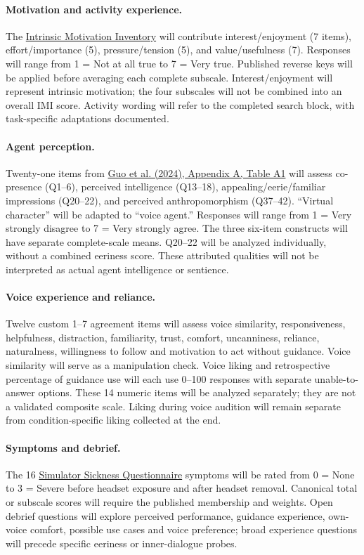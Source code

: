 \documentclass[11pt,letterpaper]{article}
\begin{document}
\paragraph{Motivation and activity experience.} The \href{https://selfdeterminationtheory.org/intrinsic-motivation-inventory/}{Intrinsic Motivation Inventory} will contribute interest/enjoyment (7 items), effort/importance (5), pressure/tension (5), and value/usefulness (7). Responses will range from 1 = Not at all true to 7 = Very true. Published reverse keys will be applied before averaging each complete subscale. Interest/enjoyment will represent intrinsic motivation; the four subscales will not be combined into an overall IMI score. Activity wording will refer to the completed search block, with task-specific adaptations documented.

\paragraph{Agent perception.} Twenty-one items from \href{https://doi.org/10.1145/3651288}{Guo et al. (2024), Appendix A, Table A1} will assess co-presence (Q1--6), perceived intelligence (Q13--18), appealing/eerie/familiar impressions (Q20--22), and perceived anthropomorphism (Q37--42). ``Virtual character'' will be adapted to ``voice agent.'' Responses will range from 1 = Very strongly disagree to 7 = Very strongly agree. The three six-item constructs will have separate complete-scale means. Q20--22 will be analyzed individually, without a combined eeriness score. These attributed qualities will not be interpreted as actual agent intelligence or sentience.

\paragraph{Voice experience and reliance.} Twelve custom 1--7 agreement items will assess voice similarity, responsiveness, helpfulness, distraction, familiarity, trust, comfort, uncanniness, reliance, naturalness, willingness to follow and motivation to act without guidance. Voice similarity will serve as a manipulation check. Voice liking and retrospective percentage of guidance use will each use 0--100 responses with separate unable-to-answer options. These 14 numeric items will be analyzed separately; they are not a validated composite scale. Liking during voice audition will remain separate from condition-specific liking collected at the end.

\paragraph{Symptoms and debrief.} The 16 \href{https://doi.org/10.1207/s15327108ijap0303_3}{Simulator Sickness Questionnaire} symptoms will be rated from 0 = None to 3 = Severe before headset exposure and after headset removal. Canonical total or subscale scores will require the published membership and weights. Open debrief questions will explore perceived performance, guidance experience, own-voice comfort, possible use cases and voice preference; broad experience questions will precede specific eeriness or inner-dialogue probes.
\end{document}
